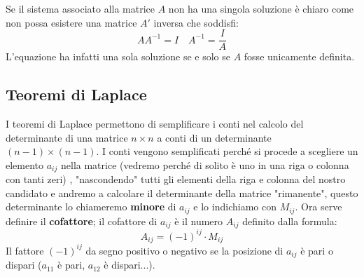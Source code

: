 \documentclass[x11names]{article}
\begin{document}
\noindent
Se il sistema associato alla matrice $A$ non ha una singola soluzione è chiaro come non possa esistere una matrice $A'$ inversa che soddisfi:
$$
AA^{-1}= I \quad A^{-1} = \frac{I}{A}
$$
L'equazione ha infatti una sola soluzione se e solo se $A$ fosse unicamente definita.


\subsection{Teoremi di Laplace}
I teoremi di Laplace permettono di semplificare i conti nel calcolo del determinante di una matrice $n \times n$  a conti di un determinante $(n-1) \times (n-1)$. I conti vengono semplificati perché si procede a scegliere un elemento $a_{ij}$ nella matrice (vedremo perché di solito è uno in una riga o colonna con tanti zeri) , "nascondendo" tutti gli elementi della riga e colonna del nostro candidato e andremo a calcolare il determinante della matrice "rimanente", questo determinante lo chiameremo \textbf{minore} di $a_{ij}$  e lo indichiamo con $M_{ij}$.
Ora serve definire il \textbf{cofattore}; il cofattore di $a_{ij}$ è il numero $A_{ij}$ definito dalla formula:
$$
A_{ij}  = (-1)^{ij}\cdot M_{ij}
$$
Il fattore $(-1)^{ij}$ da segno positivo o negativo se la posizione di $a_{ij}$ è pari o dispari ($a_{11}$ è pari, $a_{12}$ è dispari...). 
\end{document}
